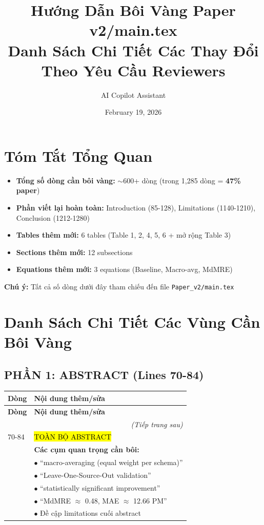\documentclass[11pt,a4paper]{article}
\title{\textbf{Hướng Dẫn Bôi Vàng Paper v2/main.tex}\\
\large Danh Sách Chi Tiết Các Thay Đổi Theo Yêu Cầu Reviewers}
\author{AI Copilot Assistant}
\date{February 19, 2026}
\begin{document}
\maketitle

\section*{Tóm Tắt Tổng Quan}

\begin{itemize}
    \item \textbf{Tổng số dòng cần bôi vàng:} $\sim$600+ dòng (trong 1,285 dòng = \textbf{47\% paper})
    \item \textbf{Phần viết lại hoàn toàn:} Introduction (85-128), Limitations (1140-1210), Conclusion (1212-1280)
    \item \textbf{Tables thêm mới:} 6 tables (Table 1, 2, 4, 5, 6 + mở rộng Table 3)
    \item \textbf{Sections thêm mới:} 12 subsections
    \item \textbf{Equations thêm mới:} 3 equations (Baseline, Macro-avg, MdMRE)
\end{itemize}

\vspace{1em}
\noindent\colorbox{yellow!30}{\parbox{\dimexpr\textwidth-2\fboxsep}{\textbf{Chú ý:} Tất cả số dòng dưới đây tham chiếu đến file \texttt{Paper\_v2/main.tex}}}

\section{Danh Sách Chi Tiết Các Vùng Cần Bôi Vàng}

\subsection*{PHẦN 1: ABSTRACT (Lines 70-84)}

\begin{longtable}{p{}p{}}
\toprule
\textbf{Dòng} & \textbf{Nội dung thêm/sửa} \\
\midrule
\endfirsthead
\toprule
\textbf{Dòng} & \textbf{Nội dung thêm/sửa} \\
\midrule
\endhead
\midrule
\multicolumn{2}{r}{\textit{(Tiếp trang sau)}} \\
\endfoot
\bottomrule
\endlastfoot

70-84 & \hl{TOÀN BỘ ABSTRACT} \\
& \textbf{Các cụm quan trọng cần bôi:} \\
& $\bullet$ ``macro-averaging (equal weight per schema)'' \\
& $\bullet$ ``Leave-One-Source-Out validation'' \\
& $\bullet$ ``statistically significant improvement'' \\
& $\bullet$ ``MdMRE $\approx$ 0.48, MAE $\approx$ 12.66 PM'' \\
& $\bullet$ Đề cập limitations cuối abstract \\
\end{longtable}
\end{document}
